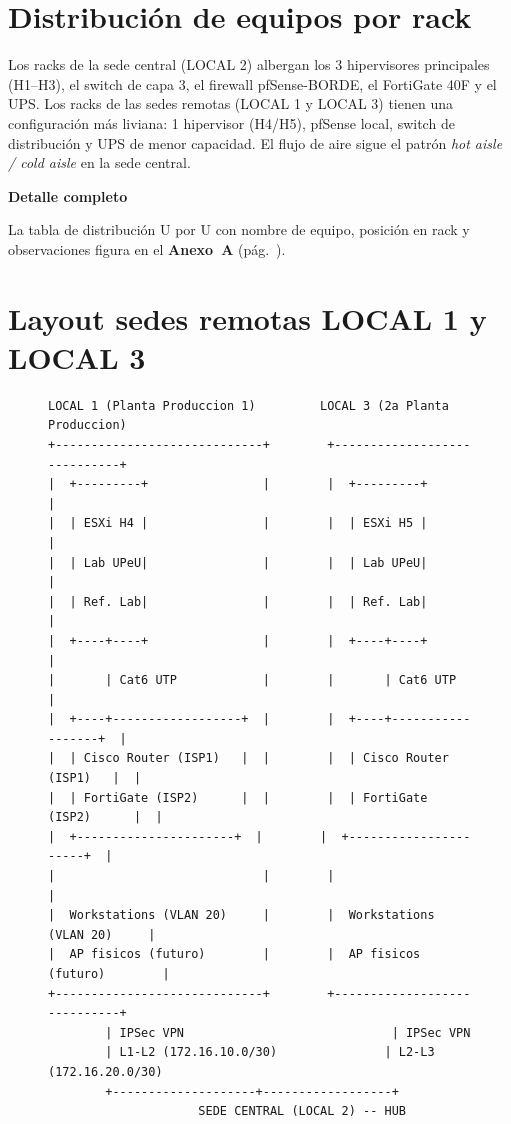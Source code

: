 \documentclass[11pt, a4paper, oneside]{report}
\newenvironment{notabox}[1]{%
  \begin{lrbox}{\notaboxsb}%
  \begin{minipage}{\dimexpr\textwidth-2\fboxsep\relax}%
  \vspace{4pt}\textcolor{upeu_dark}{\textbf{#1}}\\[2pt]\small%
}{%
  \vspace{4pt}%
  \end{minipage}%
  \end{lrbox}%
  \vspace{6pt}\par\noindent\colorbox{upeu_light}{\usebox{\notaboxsb}}\par\vspace{6pt}%
}
\begin{document}
\section{Distribución de equipos por rack}

Los racks de la sede central (LOCAL 2) albergan los 3 hipervisores principales (H1--H3), el switch de capa 3, el firewall pfSense-BORDE, el FortiGate 40F y el UPS. Los racks de las sedes remotas (LOCAL 1 y LOCAL 3) tienen una configuración más liviana: 1 hipervisor (H4/H5), pfSense local, switch de distribución y UPS de menor capacidad. El flujo de aire sigue el patrón \textit{hot aisle / cold aisle} en la sede central.

\begin{notabox}{Detalle completo}
La tabla de distribución U por U con nombre de equipo, posición en rack y observaciones figura en el \textbf{Anexo~A} (pág.~\pageref{anex:rack}).
\end{notabox}
\section{Layout sedes remotas LOCAL 1 y LOCAL 3}

\begin{figure}[H]
\centering
\begin{lstlisting}[style=diagrama, caption={Layout físico LOCAL 1 y LOCAL 3 (estructura simétrica)}, label={fig:layout_locales}]
LOCAL 1 (Planta Produccion 1)         LOCAL 3 (2a Planta Produccion)
+-----------------------------+        +-----------------------------+
|  +---------+                |        |  +---------+                |
|  | ESXi H4 |                |        |  | ESXi H5 |                |
|  | Lab UPeU|                |        |  | Lab UPeU|                |
|  | Ref. Lab|                |        |  | Ref. Lab|                |
|  +----+----+                |        |  +----+----+                |
|       | Cat6 UTP            |        |       | Cat6 UTP            |
|  +----+------------------+  |        |  +----+------------------+  |
|  | Cisco Router (ISP1)   |  |        |  | Cisco Router (ISP1)   |  |
|  | FortiGate (ISP2)      |  |        |  | FortiGate (ISP2)      |  |
|  +----------------------+  |        |  +----------------------+  |
|                             |        |                             |
|  Workstations (VLAN 20)     |        |  Workstations (VLAN 20)     |
|  AP fisicos (futuro)        |        |  AP fisicos (futuro)        |
+-----------------------------+        +-----------------------------+
        | IPSec VPN                             | IPSec VPN
        | L1-L2 (172.16.10.0/30)               | L2-L3 (172.16.20.0/30)
        +--------------------+------------------+
                     SEDE CENTRAL (LOCAL 2) -- HUB
\end{lstlisting}
\end{figure}
\end{document}
